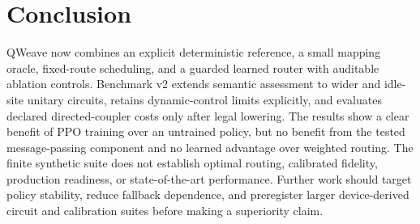 \documentclass[a4paper,10pt,twocolumn]{article}
\begin{document}
\section{Conclusion}
QWeave now combines an explicit deterministic reference, a small mapping
oracle, fixed-route scheduling, and a guarded learned router with auditable
ablation controls. Benchmark v2 extends semantic assessment to wider and
idle-site unitary circuits, retains dynamic-control limits explicitly, and
evaluates declared directed-coupler costs only after legal lowering. The
results show a clear benefit of PPO training over an untrained policy, but no
benefit from the tested message-passing component and no learned advantage
over weighted routing. The finite synthetic suite does not establish optimal
routing, calibrated fidelity, production readiness, or state-of-the-art
performance. Further work should target policy stability, reduce fallback
dependence, and preregister larger device-derived circuit and calibration
suites before making a superiority claim.



\end{document}
